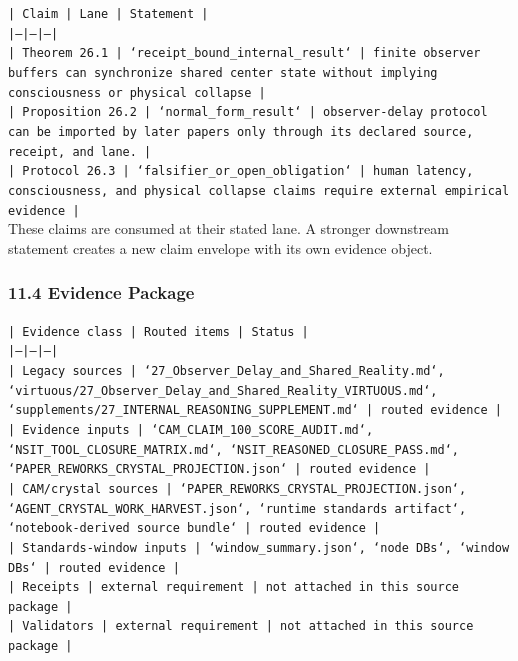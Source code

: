 \documentclass[11pt]{article}
\begin{document}
\noindent\texttt{| Claim | Lane | Statement |}\\
\noindent\texttt{|---|---|---|}\\
\noindent\texttt{| Theorem 26.1 | `receipt\_bound\_internal\_result` | finite observer buffers can synchronize shared center state without implying consciousness or physical collapse |}\\
\noindent\texttt{| Proposition 26.2 | `normal\_form\_result` | observer-delay protocol can be imported by later papers only through its declared source, receipt, and lane. |}\\
\noindent\texttt{| Protocol 26.3 | `falsifier\_or\_open\_obligation` | human latency, consciousness, and physical collapse claims require external empirical evidence |}\\

These claims are consumed at their stated lane. A stronger downstream statement
creates a new claim envelope with its own evidence object.

\subsubsection*{11.4 Evidence Package}

\noindent\texttt{| Evidence class | Routed items | Status |}\\
\noindent\texttt{|---|---|---|}\\
\noindent\texttt{| Legacy sources | `27\_Observer\_Delay\_and\_Shared\_Reality.md`, `virtuous/27\_Observer\_Delay\_and\_Shared\_Reality\_VIRTUOUS.md`, `supplements/27\_INTERNAL\_REASONING\_SUPPLEMENT.md` | routed evidence |}\\
\noindent\texttt{| Evidence inputs | `CAM\_CLAIM\_100\_SCORE\_AUDIT.md`, `NSIT\_TOOL\_CLOSURE\_MATRIX.md`, `NSIT\_REASONED\_CLOSURE\_PASS.md`, `PAPER\_REWORKS\_CRYSTAL\_PROJECTION.json` | routed evidence |}\\
\noindent\texttt{| CAM/crystal sources | `PAPER\_REWORKS\_CRYSTAL\_PROJECTION.json`, `AGENT\_CRYSTAL\_WORK\_HARVEST.json`, `runtime standards artifact`, `notebook-derived source bundle` | routed evidence |}\\
\noindent\texttt{| Standards-window inputs | `window\_summary.json`, `node DBs`, `window DBs` | routed evidence |}\\
\noindent\texttt{| Receipts | external requirement | not attached in this source package |}\\
\noindent\texttt{| Validators | external requirement | not attached in this source package |}\\
\end{document}
